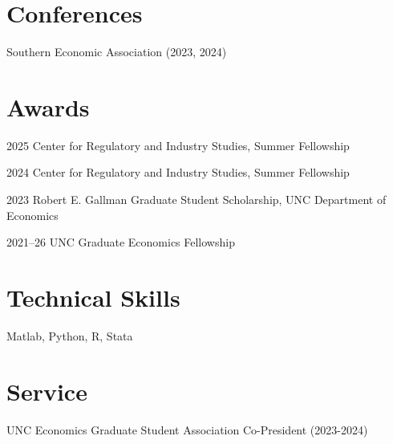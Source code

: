 \documentclass[12pt,letterpaper]{report}
\newcommand{\listitemspace}{0.25em}
\renewenvironment{itemize}
{\begin{list}{}{\setlength{\leftmargin}{0em}
			\setlength{\parskip}{0em}
			\setlength{\itemsep}{\listitemspace}
			\setlength{\parsep}{\listitemspace}}}
	{\end{list}}
\begin{document}
    \section*{Conferences}
	
	\begin{itemize}
        \item Southern Economic Association (2023, 2024)
	\end{itemize}
	

	\section*{Awards}
	
	\begin{tablist}
        \item[2025] \tab{}Center for Regulatory and Industry Studies, Summer Fellowship
		\item[2024] \tab{}Center for Regulatory and Industry Studies, Summer Fellowship
		\item[2023] \tab{}Robert E. Gallman Graduate Student Scholarship, UNC Department of Economics
		\item[2021--26] \tab{}UNC Graduate Economics Fellowship
	\end{tablist}
	
	
	\section*{Technical Skills}
	
	Matlab, Python, R, Stata
	
	\section*{Service}
	
	UNC Economics Graduate Student Association Co-President (2023-2024)
	
	
\end{document}
